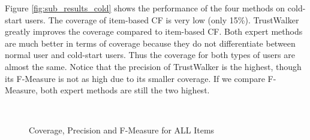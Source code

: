 \documentclass[12pt]{article}
\begin{document}
Figure \ref{fig:sub_results_cold} shows the performance of the four methods on cold-start users. The coverage of item-based CF is very low (only 15\%). TrustWalker greatly improves the coverage compared to item-based CF. Both expert methods are much better in terms of coverage because they do not differentiate between normal user and cold-start users. Thus the coverage for both types of users are almost the same. Notice that the precision of TrustWalker is the highest, though its F-Measure is not as high due to its smaller coverage. If we compare F-Measure, both expert methods are still the two highest.


\begin{figure}[htbp]
	\centering
	\\
	\caption{Coverage, Precision and F-Measure for ALL Items}
	\label{fig:results_all}
\end{figure}
\end{document}
